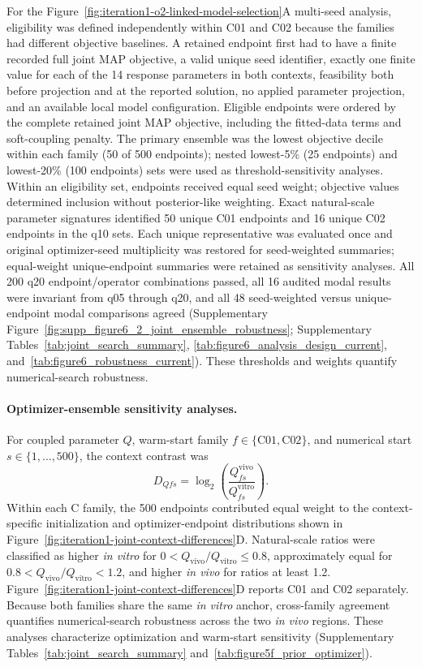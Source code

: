 \documentclass[11pt]{article}
\begin{document}
For the Figure~\ref{fig:iteration1-o2-linked-model-selection}A multi-seed analysis, eligibility was defined independently within C01 and C02 because the families had different objective baselines. A retained endpoint first had to have a finite recorded full joint MAP objective, a valid unique seed identifier, exactly one finite value for each of the 14 response parameters in both contexts, feasibility both before projection and at the reported solution, no applied parameter projection, and an available local model configuration. Eligible endpoints were ordered by the complete retained joint MAP objective, including the fitted-data terms and soft-coupling penalty. The primary ensemble was the lowest objective decile within each family (50 of 500 endpoints); nested lowest-5\% (25 endpoints) and lowest-20\% (100 endpoints) sets were used as threshold-sensitivity analyses. Within an eligibility set, endpoints received equal seed weight; objective values determined inclusion without posterior-like weighting. Exact natural-scale parameter signatures identified 50 unique C01 endpoints and 16 unique C02 endpoints in the q10 sets. Each unique representative was evaluated once and original optimizer-seed multiplicity was restored for seed-weighted summaries; equal-weight unique-endpoint summaries were retained as sensitivity analyses. All 200 q20 endpoint/operator combinations passed, all 16 audited modal results were invariant from q05 through q20, and all 48 seed-weighted versus unique-endpoint modal comparisons agreed (Supplementary Figure~\ref{fig:supp_figure6_2_joint_ensemble_robustness}; Supplementary Tables~\ref{tab:joint_search_summary}, \ref{tab:figure6_analysis_design_current}, and~\ref{tab:figure6_robustness_current}). These thresholds and weights quantify numerical-search robustness.

\paragraph{Optimizer-ensemble sensitivity analyses.}
For coupled parameter $Q$, warm-start family $f\in\{\mathrm{C01},\mathrm{C02}\}$, and numerical start $s\in\{1,\ldots,500\}$, the context contrast was
\begin{equation}
D_{Qfs}=\log_2\!\left(\frac{Q^{\mathrm{vivo}}_{fs}}{Q^{\mathrm{vitro}}_{fs}}\right).
\label{eq:appendix_joint_family_log2_ratio}
\end{equation}
Within each C family, the 500 endpoints contributed equal weight to the context-specific initialization and optimizer-endpoint distributions shown in Figure~\ref{fig:iteration1-joint-context-differences}D. Natural-scale ratios were classified as higher \textit{in vitro} for $0<Q_{\mathrm{vivo}}/Q_{\mathrm{vitro}}\leq0.8$, approximately equal for $0.8<Q_{\mathrm{vivo}}/Q_{\mathrm{vitro}}<1.2$, and higher \textit{in vivo} for ratios at least 1.2. Figure~\ref{fig:iteration1-joint-context-differences}D reports C01 and C02 separately. Because both families share the same \textit{in vitro} anchor, cross-family agreement quantifies numerical-search robustness across the two \textit{in vivo} regions. These analyses characterize optimization and warm-start sensitivity (Supplementary Tables~\ref{tab:joint_search_summary} and~\ref{tab:figure5f_prior_optimizer}).
\end{document}
